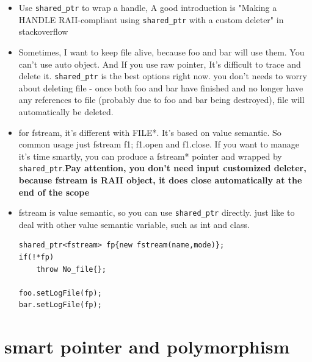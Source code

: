 \documentclass[a4paper,11pt,twoside]{book}
\begin{document}
\begin{itemize}
	

	\item Use \texttt{shared\_ptr} to wrap a handle, A good introduction is "Making a HANDLE RAII-compliant using \texttt{shared\_ptr} with a custom deleter" in stackoverflow
	
	
	\item Sometimes, I want to keep file alive, because foo and bar will use them. You can't use auto object. And If you use raw pointer, It's difficult to trace and delete it. \texttt{shared\_ptr} is the best options right now.  you don't needs to worry about deleting file - once both foo and bar have finished and no longer have any references to file (probably due to foo and bar being destroyed), file will automatically be deleted.
	
	\item for fstream, it's different with FILE*. It's based on value semantic. So common usage just fstream f1; f1.open and f1.close. If you want to manage it's time smartly, you can produce a fstream* pointer and wrapped by \texttt{shared\_ptr}.\textbf{Pay attention, you don't need input customized deleter, because fstream is RAII object, it does close automatically at the end of the scope}
	
	\item fstream is value semantic, so you can use \texttt{shared\_ptr} directly. just like to deal with other value semantic variable, such as int and class.
\begin{lstlisting}[numbers=none]
shared_ptr<fstream> fp{new fstream(name,mode)};
if(!*fp)
	throw No_file{};
	
foo.setLogFile(fp);
bar.setLogFile(fp);
\end{lstlisting}

\end{itemize}


\section{smart pointer and polymorphism}
\end{document}
